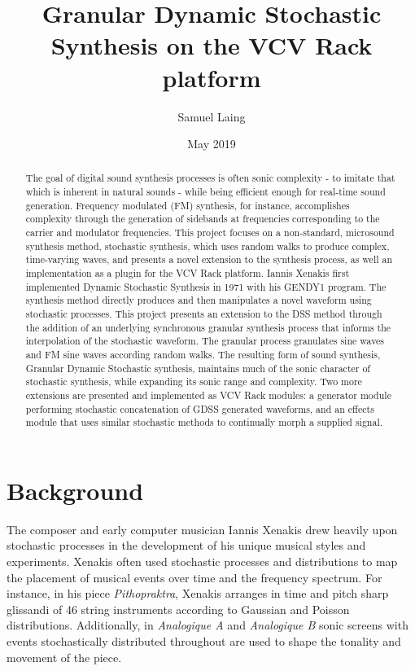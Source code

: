\documentclass[10pt]{article}
\title{Granular Dynamic Stochastic Synthesis on the VCV Rack platform}
\author{Samuel Laing}
\date{May 2019}
\begin{document}
\maketitle
\begin{abstract}
The goal of digital sound synthesis processes is often sonic complexity - to imitate that which is inherent in natural sounds - while being efficient enough for real-time sound generation. Frequency modulated (FM) synthesis, for instance, accomplishes complexity through the generation of sidebands at frequencies corresponding to the carrier and modulator frequencies. This project focuses on a non-standard, microsound synthesis method, stochastic synthesis, which uses random walks to produce complex, time-varying waves, and presents a novel extension to the synthesis process, as well an implementation as a plugin for the VCV Rack platform. Iannis Xenakis first implemented Dynamic Stochastic Synthesis in 1971 with his GENDY1 program. The synthesis method directly produces and then manipulates a novel waveform using stochastic processes. This project presents an extension to the DSS method through the addition of an underlying synchronous granular synthesis process that informs the interpolation of the stochastic waveform. The granular process granulates sine waves and FM sine waves according random walks. The resulting form of sound synthesis, Granular Dynamic Stochastic synthesis, maintains much of the sonic character of stochastic synthesis, while expanding its sonic range and complexity. Two more extensions are presented and implemented as VCV Rack modules: a generator module performing stochastic concatenation of GDSS generated waveforms, and an effects module that uses similar stochastic methods to continually morph a supplied signal.
\end{abstract}

\pagebreak
\section{Background}
The composer and early computer musician Iannis Xenakis drew heavily upon stochastic processes in the development of his unique musical styles and experiments. Xenakis often used stochastic processes and distributions to map the placement of musical events over time and the frequency spectrum. For instance, in his piece \textit{Pithopraktra}, Xenakis arranges in time and pitch sharp glissandi of 46 string instruments according to Gaussian and Poisson distributions.\citep{xenakis1992} Additionally, in \textit{Analogique A} and \textit{Analogique B} sonic screens with events stochastically distributed throughout are used to shape the tonality and movement of the piece. 
\end{document}
